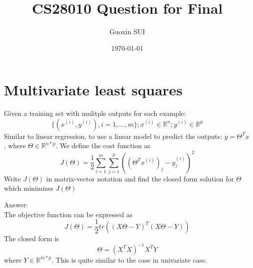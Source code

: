 \documentclass{article}
\title{CS28010 Question for Final}
\author{Guoxin SUI}
\date{\today}
\newenvironment{answer}{\par\color{ForestGreen}}{\par}
\begin{document}
\maketitle

\section{Multivariate least squares}

Given a training set with mulitple outputs for each example:
$$\{(x^{(i)}, y^{(i)}), i= 1,...,m\}; x^{(i)} \in \mathbb{R}^n; y^{(i)} \in \mathbb{R}^p $$
Similar to linear regression, to use a linear model to predict the outputs:
$y = \Theta^Tx$, where $\Theta \in \mathbb{R}^{n*p}$.
We define the cost function as
$$J(\Theta) = \frac{1}{2}\sum_{i=1}^m\sum_{j=1}^p\left((\Theta^Tx^{(i)})_j - y_j^{(i)}\right)^2$$
Write $J(\Theta)$ in matrix-vector notation and find the closed form solution for $\Theta$ which minimizes $J(\Theta)$
\begin{answer}
Answer: \\
The objective function can be expressed as $$J(\Theta) = \frac{1}{2}tr\left((X\Theta - Y)^T(X\Theta - Y)\right)$$
The closed form is $$\Theta = (X^TX)^{-1}X^TY$$where $Y\in \mathbb{R}^{m*p}$. This is quite similar to the case in univariate case.
\end{answer}
\end{document}
